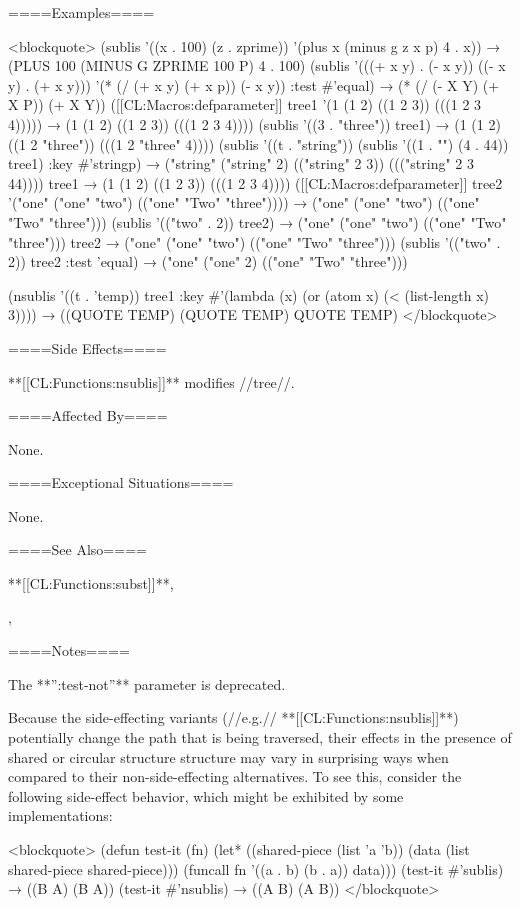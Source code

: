 ====Examples====

<blockquote> (sublis '((x . 100) (z . zprime)) '(plus x (minus g z x p) 4 . x)) → (PLUS 100 (MINUS G ZPRIME 100 P) 4 . 100) (sublis '(((+ x y) . (- x y)) ((- x y) . (+ x y))) '(* (/ (+ x y) (+ x p)) (- x y)) :test #'equal) → (* (/ (- X Y) (+ X P)) (+ X Y)) ([[CL:Macros:defparameter]] tree1 '(1 (1 2) ((1 2 3)) (((1 2 3 4))))) → (1 (1 2) ((1 2 3)) (((1 2 3 4)))) (sublis '((3 . "three")) tree1) → (1 (1 2) ((1 2 "three")) (((1 2 "three" 4)))) (sublis '((t . "string")) (sublis '((1 . "") (4 . 44)) tree1) :key #'stringp) → ("string" ("string" 2) (("string" 2 3)) ((("string" 2 3 44)))) tree1 → (1 (1 2) ((1 2 3)) (((1 2 3 4)))) ([[CL:Macros:defparameter]] tree2 '("one" ("one" "two") (("one" "Two" "three")))) → ("one" ("one" "two") (("one" "Two" "three"))) (sublis '(("two" . 2)) tree2) → ("one" ("one" "two") (("one" "Two" "three"))) tree2 → ("one" ("one" "two") (("one" "Two" "three"))) (sublis '(("two" . 2)) tree2 :test 'equal) → ("one" ("one" 2) (("one" "Two" "three")))

(nsublis '((t . 'temp)) tree1 :key #'(lambda (x) (or (atom x) (< (list-length x) 3)))) → ((QUOTE TEMP) (QUOTE TEMP) QUOTE TEMP) </blockquote>

====Side Effects====

**[[CL:Functions:nsublis]]** modifies //tree//.

====Affected By====

None.

====Exceptional Situations====

None.

====See Also====

**[[CL:Functions:subst]]**,

{\secref\ConstantModification},

{\secref\TraversalRules}

====Notes====

The **'':test-not''** parameter is deprecated.

Because the side-effecting variants (//e.g.// **[[CL:Functions:nsublis]]**) potentially change the path that is being traversed, their effects in the presence of shared or circular structure structure may vary in surprising ways when compared to their non-side-effecting alternatives. To see this, consider the following side-effect behavior, which might be exhibited by some implementations:

<blockquote> (defun test-it (fn) (let* ((shared-piece (list 'a 'b)) (data (list shared-piece shared-piece))) (funcall fn '((a . b) (b . a)) data))) (test-it #'sublis) → ((B A) (B A)) (test-it #'nsublis) → ((A B) (A B)) </blockquote>

    
